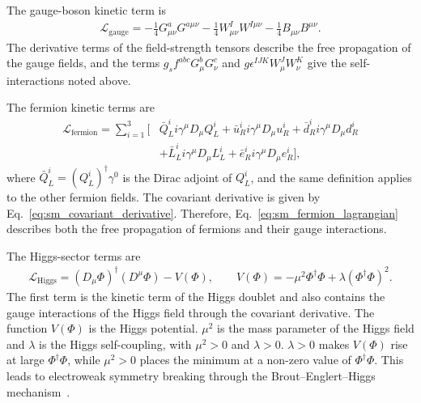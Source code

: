 The gauge-boson kinetic term is
\begin{align}
    \mathcal{L}_{\mathrm{gauge}}
    =
    -
    \frac{1}{4}
    G_{\mu\nu}^{a}G^{a\mu\nu}
    -
    \frac{1}{4}
    W_{\mu\nu}^{I}W^{I\mu\nu}
    -
    \frac{1}{4}
    B_{\mu\nu}B^{\mu\nu}.
    \label{eq:sm_gauge_lagrangian}
\end{align}
The derivative terms of the field-strength tensors describe the free propagation of the gauge fields, and the terms $g_{s}f^{abc}G_{\mu}^{b}G_{\nu}^{c}$ and $g\epsilon^{IJK}W_{\mu}^{J}W_{\nu}^{K}$ give the self-interactions noted above.

The fermion kinetic terms are
\begin{align}
    \mathcal{L}_{\mathrm{fermion}}
    =
    \sum_{i=1}^{3}
    \bigg[
        &
        \bar{Q}_{L}^{i} i\gamma^{\mu}D_{\mu}Q_{L}^{i}
        +
        \bar{u}_{R}^{i} i\gamma^{\mu}D_{\mu}u_{R}^{i}
        +
        \bar{d}_{R}^{i} i\gamma^{\mu}D_{\mu}d_{R}^{i}
    \nonumber\\
        &+
        \bar{L}_{L}^{i} i\gamma^{\mu}D_{\mu}L_{L}^{i}
        +
        \bar{e}_{R}^{i} i\gamma^{\mu}D_{\mu}e_{R}^{i}
    \bigg],
    \label{eq:sm_fermion_lagrangian}
\end{align}
where $\bar{Q}_{L}^{i}=(Q_{L}^{i})^{\dagger}\gamma^{0}$ is the Dirac adjoint of $Q_{L}^{i}$, and the same definition applies to the other fermion fields.
The covariant derivative is given by Eq.~\eqref{eq:sm_covariant_derivative}. 
Therefore, Eq.~\eqref{eq:sm_fermion_lagrangian} describes both the free propagation of fermions and their gauge interactions.

The Higgs-sector terms are
\begin{align}
    \mathcal{L}_{\mathrm{Higgs}}
    =
    (D_{\mu}\Phi)^{\dagger}(D^{\mu}\Phi)
    -
    V(\Phi),
    \qquad
    V(\Phi)
    =
    -
    \mu^{2}\Phi^{\dagger}\Phi
    +
    \lambda(\Phi^{\dagger}\Phi)^{2}.
    \label{eq:sm_higgs_lagrangian}
\end{align}
The first term is the kinetic term of the Higgs doublet and also contains the gauge interactions of the Higgs field through the covariant derivative. 
The function $V(\Phi)$ is the Higgs potential. 
$\mu^{2}$ is the mass parameter of the Higgs field and $\lambda$ is the Higgs self-coupling, with $\mu^{2}>0$ and $\lambda>0$.
$\lambda>0$ makes $V(\Phi)$ rise at large $\Phi^{\dagger}\Phi$, while $\mu^{2}>0$ places the minimum at a non-zero value of $\Phi^{\dagger}\Phi$. 
This leads to electroweak symmetry breaking through the Brout--Englert--Higgs mechanism~\cite{Englert1964,Higgs1964,Guralnik1964}.

